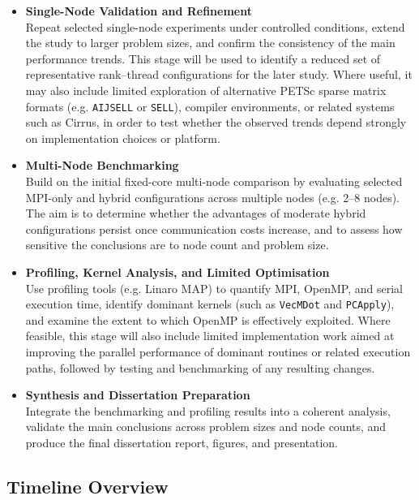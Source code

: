 \documentclass{article}
\begin{document}
\begin{itemize}

    \item \textbf{Single-Node Validation and Refinement} \\
    Repeat selected single-node experiments under controlled conditions, extend the study to larger problem sizes, and confirm the consistency of the main performance trends. 
    This stage will be used to identify a reduced set of representative rank--thread configurations for the later study. 
    Where useful, it may also include limited exploration of alternative PETSc sparse matrix formats (e.g. \texttt{AIJSELL} or \texttt{SELL}), compiler environments, or related systems such as Cirrus, in order to test whether the observed trends depend strongly on implementation choices or platform.

    \item \textbf{Multi-Node Benchmarking} \\
    Build on the initial fixed-core multi-node comparison by evaluating selected MPI-only and hybrid configurations across multiple nodes (e.g. 2--8 nodes). 
    The aim is to determine whether the advantages of moderate hybrid configurations persist once communication costs increase, and to assess how sensitive the conclusions are to node count and problem size.

    \item \textbf{Profiling, Kernel Analysis, and Limited Optimisation} \\
    Use profiling tools (e.g. Linaro MAP) to quantify MPI, OpenMP, and serial execution time, identify dominant kernels (such as \texttt{VecMDot} and \texttt{PCApply}), and examine the extent to which OpenMP is effectively exploited. 
    Where feasible, this stage will also include limited implementation work aimed at improving the parallel performance of dominant routines or related execution paths, followed by testing and benchmarking of any resulting changes.

    \item \textbf{Synthesis and Dissertation Preparation} \\
    Integrate the benchmarking and profiling results into a coherent analysis, validate the main conclusions across problem sizes and node counts, and produce the final dissertation report, figures, and presentation.
\end{itemize}

\subsection{Timeline Overview}
\end{document}
